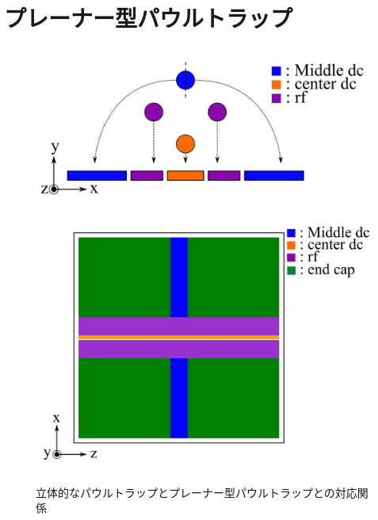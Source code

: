 \section{プレーナー型パウルトラップ}
\begin{figure}[h]
	\begin{center}
		\begin{minipage}{0.48\linewidth}
			\begin{center}
			\includegraphics[width = 0.98\columnwidth]{./theory/figure/PaulTrap_3Dto2D_3DTrap.png}
			\end{center}
		\end{minipage}
		\begin{minipage}{0.48\linewidth}
			\begin{center}
			\includegraphics[width = 0.98\columnwidth]{./theory/figure/PaulTrap_3Dto2D_2DTrap.png}
			\end{center}
		\end{minipage}
	\end{center}
	\caption{立体的なパウルトラップとプレーナー型パウルトラップとの対応関係}
\end{figure}
